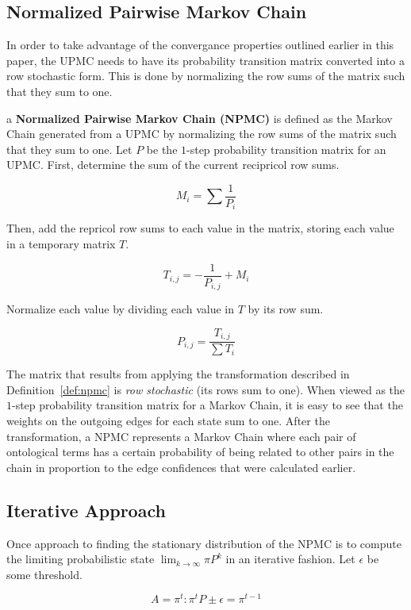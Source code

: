 \documentclass[letterpaper,twocolumn,12pt]{article}
\begin{document}
\subsection{Normalized Pairwise Markov Chain}

In order to take advantage of the convergance properties outlined earlier in this paper, the UPMC needs to have its probability transition matrix converted into a row stochastic form. 
This is done by normalizing the row sums of the matrix such that they sum to one.

\begin{defn}
\label{def:npmc}
a {\bf Normalized Pairwise Markov Chain (NPMC)} is defined as the Markov Chain generated from a UPMC by normalizing the row sums of the matrix such that they sum to one. Let $P$ be the $1$-step probability transition matrix for an UPMC. First, determine the sum of the current recipricol row sums.

$$ M_i = \sum \frac{1}{P_i} $$

\noindent Then, add the repricol row sums to each value in the matrix, storing each value in a temporary matrix $T$.

$$ T_{i,j} = -\frac{1}{P_{i,j}} + M_i $$

\noindent Normalize each value by dividing each value in $T$ by its row sum.

$$ P_{i,j} = \frac{T_{i,j}}{\sum T_i} $$
\end{defn}

\noindent The matrix that results from applying the transformation described in Definition~\ref{def:npmc} is \textit{row stochastic} (its rows sum to one).
When viewed as the $1$-step probability transition matrix for a Markov Chain, it is easy to see that the weights on the outgoing edges for each state sum to one.
After the transformation, a NPMC represents a Markov Chain where each pair of ontological terms has a certain probability of being related to other pairs in the chain in proportion to the edge confidences that were calculated earlier.

\subsection{Iterative Approach}

Once approach to finding the stationary distribution of the NPMC is to compute the limiting probabilistic state $\lim_{k \to \infty} \pi P^k$ in an iterative fashion. 
Let $\epsilon$ be some threshold.

$$ A = \pi^t : \pi^t P \pm \epsilon = \pi^{t-1} $$
\end{document}
